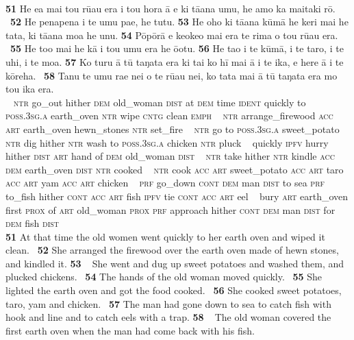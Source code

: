 ~

\bigskip\gll
\textbf{\textup{51}} He e{\ꞌ}a mai tou rū{\ꞌ}au era {\ꞌ}i tou hora {\ꞌ}ā e ki tā{\ꞌ}ana {\ꞌ}umu, he amo ka ma{\ꞌ}itaki rō. ~\textbf{\textup{52}} He penapena i te {\ꞌ}umu pae, he tutu. \textbf{\textup{53}} He oho ki tā{\ꞌ}ana kūmā he keri mai he tata, ki tā{\ꞌ}ana moa he unu. \textbf{\textup{54}} Pōpōrā e ke{\ꞌ}oke{\ꞌ}o mai era te rima o tou rū{\ꞌ}au era. ~\textbf{\textup{55}} He to{\ꞌ}o mai he kā i tou {\ꞌ}umu era he {\ꞌ}ō{\ꞌ}otu. \textbf{\textup{56}} He ta{\ꞌ}o i te kūmā, i te taro, i te {\ꞌ}uhi, i te moa. \textbf{\textup{57}} Ko turu {\ꞌ}ā tū taŋata era ki tai ko hī mai {\ꞌ}ā i te ika, e here {\ꞌ}ā i te kōreha. ~\textbf{\textup{58}} Tanu te {\ꞌ}umu ra{\ꞌ}e nei o te rū{\ꞌ}au nei, ko tata mai {\ꞌ}ā tū taŋata era mo tou ika era.\\
~ \textsc{ntr} go\_out hither \textsc{dem} old\_woman \textsc{dist} at \textsc{dem} time \textsc{ident} quickly to \textsc{poss.3sg.a} earth\_oven \textsc{ntr} wipe \textsc{cntg} clean \textsc{emph} ~ \textsc{ntr} arrange\_firewood \textsc{acc} \textsc{art} earth\_oven hewn\_stones \textsc{ntr} set\_fire ~ \textsc{ntr} go to \textsc{poss.3sg.a} sweet\_potato \textsc{ntr} dig hither \textsc{ntr} wash to \textsc{poss.3sg.a} chicken \textsc{ntr} pluck ~ quickly \textsc{ipfv} hurry hither \textsc{dist} \textsc{art} hand of \textsc{dem} old\_woman \textsc{dist} ~ \textsc{ntr} take hither \textsc{ntr} kindle \textsc{acc} \textsc{dem} earth\_oven \textsc{dist} \textsc{ntr} cooked  ~ \textsc{ntr} cook \textsc{acc} \textsc{art} sweet\_potato \textsc{acc} \textsc{art} taro \textsc{acc} \textsc{art} yam \textsc{acc} \textsc{art} chicken ~ \textsc{prf} go\_down \textsc{cont} \textsc{dem} man \textsc{dist} to sea \textsc{prf} to\_fish hither \textsc{cont} \textsc{acc} \textsc{art} fish \textsc{ipfv} tie \textsc{cont} \textsc{acc} \textsc{art} eel ~ bury \textsc{art} earth\_oven first \textsc{prox} of \textsc{art} old\_woman \textsc{prox} \textsc{prf} approach hither \textsc{cont} \textsc{dem} man \textsc{dist} for \textsc{dem} fish \textsc{dist}\\

\medskip\glt
\textbf{\textup{51}} At that time the old women went quickly to her earth oven and wiped it clean. ~\textbf{\textup{52}} She arranged the firewood over the earth oven made of hewn stones, and kindled it. \textbf{\textup{53~~}}She went and dug up sweet potatoes and washed them, and plucked chickens. ~\textbf{\textup{54}} The hands of the old woman moved quickly. ~\textbf{\textup{55}} She lighted the earth oven and got the food cooked. ~\textbf{\textup{56}} She cooked sweet potatoes, taro, yam and chicken. ~\textbf{\textup{57}} The man had gone down to sea to catch fish with hook and line and to catch eels with a trap. \textbf{\textup{58~~}}The old woman covered the first earth oven when the man had come back with his fish.


